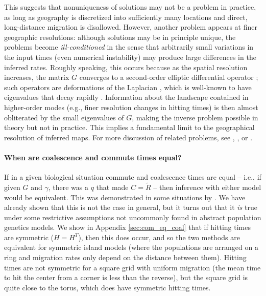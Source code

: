 \documentclass{article}
\newcommand{\comdist}{\widetilde{R}}
\begin{document}
This suggests that nonuniqueness of solutions may not be a problem in practice,
as long as geography is discretized into sufficiently many locations
and direct, long-distance migration is disallowed.
However, another problem appears at finer geographic resolutions:
although solutions may be in principle unique,
the problems become \emph{ill-conditioned} 
in the sense that arbitrarily small variations in the input times
(even numerical instability)
may produce large differences in the inferred rates.
Roughly speaking, this occurs because as the spatial resolution increases,
the matrix $G$ converges to a second-order elliptic differential operator \citep{stroock1997multidimensional};
such operators are deformations of the Laplacian \citep{feller4},
which is well-known to have eigenvalues that decay rapidly 
\citep{hpmckean1967curvature,kuttler1984eigenvalues}.
Information about the landscape contained in higher-order modes
(e.g., finer resolution changes in hitting times)
is then almost obliterated by the small eigenvalues of $G$,
making the inverse problem possible in theory but not in practice.
This implies a fundamental limit to the geographical resolution of inferred maps.
For more discussion of related problems, see 
\citet{epstein2008badtruth}, \citet{myers2008learn}, or \citet{terhorst2015fundamental}.

\paragraph{When are coalescence and commute times equal?}
If in a given biological situation commute and coalescence times are equal --
i.e., if given $G$ and $\gamma$, there was a $q$ that made $C = \comdist$ --
then inference with either model would be equivalent.
This was demonstrated in some situations by \citet{mcrae2006isolation}.
We have already shown that this is not the case in general,
but it turns out that it \emph{is} true
under some restrictive assumptions not uncommonly found in abstract population genetics models.
We show in Appendix \ref{sec:com_eq_coal} that
if hitting times are symmetric ($H = H^T$),
then this does occur,
and so the two methods are equivalent for symmetric island models
(where the populations are arranged on a ring 
and migration rates only depend on the distance between them).
Hitting times are not symmetric for a square grid with uniform migration
(the mean time to hit the center from a corner is less than the reverse),
but the square grid is quite close to the torus, which does have symmetric hitting times.
\end{document}
